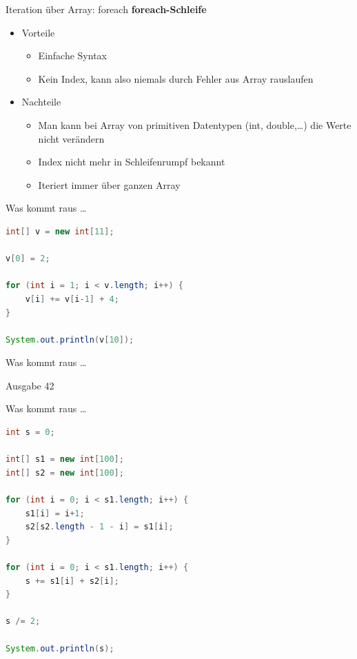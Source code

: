 \documentclass[18pt]{beamer}
\begin{document}
\begin{frame}{Iteration über Array: foreach}
    \textbf{foreach-Schleife}
    \begin{itemize}
        \item Vorteile
        \begin{itemize}
            \item Einfache Syntax
            \item Kein Index, kann also niemals durch Fehler aus Array rauslaufen

        \end{itemize}
        \pause
        \item Nachteile
        \begin{itemize}
            \item Man kann bei Array von primitiven Datentypen (int, double,\dots) die Werte nicht verändern
            \item Index nicht mehr in Schleifenrumpf bekannt
            \item Iteriert immer über ganzen Array
        \end{itemize}
    \end{itemize}
\end{frame}

\begin{frame}[fragile]{Was kommt raus \dots}
    \begin{lstlisting}[language=Java]
int[] v = new int[11];

v[0] = 2;

for (int i = 1; i < v.length; i++) {
    v[i] += v[i-1] + 4;
}

System.out.println(v[10]);
    \end{lstlisting}

\end{frame}

\begin{frame}{Was kommt raus \dots}
    \begin{exampleblock}{Ausgabe}
        42
    \end{exampleblock}
\end{frame}

\begin{frame}[fragile]{Was kommt raus \dots}
    \begin{lstlisting}[language=Java,basicstyle=\scriptsize]
int s = 0;

int[] s1 = new int[100];
int[] s2 = new int[100];

for (int i = 0; i < s1.length; i++) {
    s1[i] = i+1;
    s2[s2.length - 1 - i] = s1[i];
}

for (int i = 0; i < s1.length; i++) {
    s += s1[i] + s2[i];
}

s /= 2;

System.out.println(s);
    \end{lstlisting}

\end{frame}
\end{document}

